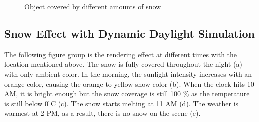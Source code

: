 \documentclass{article}
\begin{document}
\begin{figure}[h]
{    \label{fig:AllTimeNaNHalfSnow}
  }\hfill
  \caption{Object covered by different amounts of snow}
  \label{fig:9}
\end{figure}

\subsection {Snow Effect with Dynamic Daylight Simulation}
\label{headings}
The following figure group is the rendering effect at different times with the location mentioned above.
The snow is fully covered throughout the night (a) with only ambient color. In the morning, the sunlight
intensity increases with an orange color, causing the orange-to-yellow snow color (b). When the clock hits 
10 AM, it is bright enough but the snow coverage is still 100 \% as the temperature is still below 
\(0^\circ\mathrm{C}\) (c). The snow starts melting at 11 AM (d). The weather is warmest at 2 PM, as a result,
there is no snow on the scene (e). 
\end{document}
